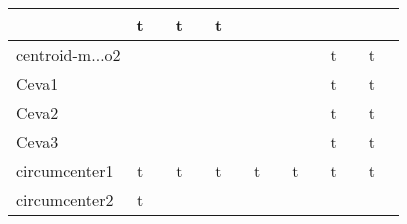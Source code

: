 {\begin{longtable}{|l|*{7}{cr|}}
& \cellcolor{green!20}t & \cellcolor{green!20}{\sl 492} 
& \cellcolor{green!40}t & \cellcolor{green!40}{ 131} 
& \cellcolor{green!30}t & \cellcolor{green!30}{ 243} 
\\ \hline
\cellcolor{blue!10}centroid-m$\ldots$o2 
& \cellcolor{yellow!25} & \cellcolor{yellow!25}{ 2} 
& \cellcolor{yellow!25} & \cellcolor{yellow!25}{ 3} 
& \cellcolor{yellow!25} & \cellcolor{yellow!25}{ 19} 
& \cellcolor{yellow!25} & \cellcolor{yellow!25}{ 237} 
& \cellcolor{yellow!25} & \cellcolor{yellow!25}{ 70} 
& \cellcolor{green!40}t & \cellcolor{green!40}{\bf 83} 
& \cellcolor{green!20}t & \cellcolor{green!20}{ 325} 
\\ \hline
\cellcolor{blue!10}Ceva1 
& \cellcolor{yellow!25} & \cellcolor{yellow!25}{ 2} 
& \cellcolor{yellow!25} & \cellcolor{yellow!25}{ 2} 
& \cellcolor{yellow!25} & \cellcolor{yellow!25}{ 54} 
& \cellcolor{yellow!25} & \cellcolor{yellow!25}{ 299} 
& \cellcolor{yellow!25} & \cellcolor{yellow!25}{ 64} 
& \cellcolor{green!40}t & \cellcolor{green!40}{\bf 81} 
& \cellcolor{green!20}t & \cellcolor{green!20}{ 388} 
\\ \hline
\cellcolor{blue!10}Ceva2 
& \cellcolor{yellow!25} & \cellcolor{yellow!25}{ 3} 
& \cellcolor{yellow!25} & \cellcolor{yellow!25}{ 3} 
& \cellcolor{yellow!25} & \cellcolor{yellow!25}{ 16} 
& \cellcolor{yellow!25} & \cellcolor{yellow!25}{ 235} 
& \cellcolor{yellow!25} & \cellcolor{yellow!25}{ 66} 
& \cellcolor{green!40}t & \cellcolor{green!40}{\bf 87} 
& \cellcolor{green!20}t & \cellcolor{green!20}{ 358} 
\\ \hline
\cellcolor{blue!10}Ceva3 
& \cellcolor{yellow!25} & \cellcolor{yellow!25}{ 2} 
& \cellcolor{yellow!25} & \cellcolor{yellow!25}{ 2} 
& \cellcolor{yellow!25} & \cellcolor{yellow!25}{ 22} 
& \cellcolor{yellow!25} & \cellcolor{yellow!25}{ 236} 
& \cellcolor{yellow!25} & \cellcolor{yellow!25}{ 79} 
& \cellcolor{green!40}t & \cellcolor{green!40}{\bf 89} 
& \cellcolor{green!20}t & \cellcolor{green!20}{ 356} 
\\ \hline
\cellcolor{blue!10}circumcenter1 
& \cellcolor{green!60}t & \cellcolor{green!60}{\bf 6} 
& \cellcolor{green!50}t & \cellcolor{green!50}{ 37} 
& \cellcolor{green!50}t & \cellcolor{green!50}{ 38} 
& \cellcolor{green!30}t & \cellcolor{green!30}{\sl 268} 
& \cellcolor{green!30}t & \cellcolor{green!30}{ 212} 
& \cellcolor{green!40}t & \cellcolor{green!40}{ 103} 
& \cellcolor{green!60}t & \cellcolor{green!60}{ 6} 
\\ \hline
\cellcolor{blue!10}circumcenter2 
& \cellcolor{green!60}t & \cellcolor{green!60}{\bf 9} 

\end{longtable}}
